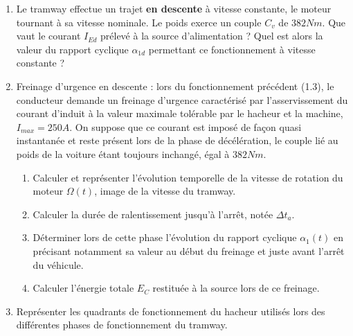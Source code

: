 \begin{enumerate}
\begin{enumerate}
\item Le tramway effectue un trajet \textbf{en descente} à vitesse constante, le moteur tournant à sa vitesse nominale. Le poids exerce un couple $C_v$ de $382 Nm$. Que vaut le courant $I_{Ed}$ prélevé à la source d’alimentation ? Quel est alors la valeur du rapport cyclique $\alpha_{1d}$ permettant ce fonctionnement à vitesse constante ?
\item Freinage d’urgence en descente : lors du fonctionnement précédent (1.3), le conducteur demande un freinage d’urgence caractérisé par l’asservissement du courant d’induit à la valeur maximale tolérable par le hacheur et la machine, $I_{max} = 250 A$. On suppose que ce courant est imposé de façon quasi instantanée et reste présent lors de la phase de décélération, le couple lié au poids de la voiture étant toujours inchangé, égal à $382 Nm$.

\begin{enumerate}
\item Calculer et représenter l’évolution temporelle de la vitesse de rotation du moteur $\Omega(t)$, image de la vitesse du tramway.
\item Calculer la durée de ralentissement jusqu’à l’arrêt, notée $\Delta t_a$.
\item Déterminer lors de cette phase l’évolution du rapport cyclique $\alpha_1(t)$ en précisant notamment sa valeur au début du freinage et juste avant l’arrêt du véhicule.
\item Calculer l’énergie totale $E_C$ restituée à la source lors de ce freinage.
\end{enumerate}

\item Représenter les quadrants de fonctionnement du hacheur utilisés lors des différentes phases de fonctionnement du tramway.
\end{enumerate}




\end{enumerate}
